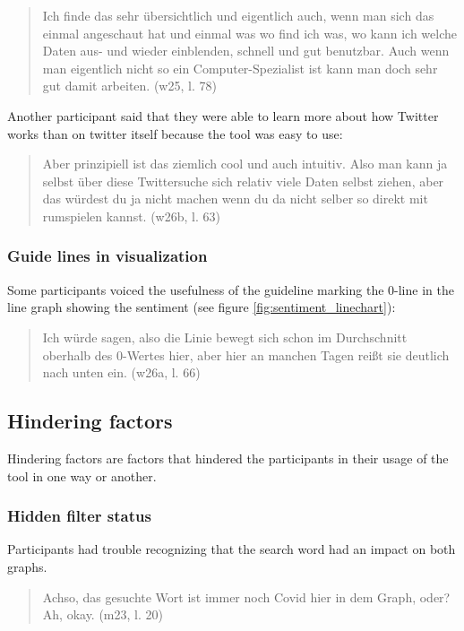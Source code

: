 \begin{quote}
    Ich finde das sehr übersichtlich und eigentlich auch, wenn man sich das einmal angeschaut hat und einmal was wo find ich was, wo kann ich welche Daten aus- und wieder einblenden, schnell und gut benutzbar. Auch wenn man eigentlich nicht so ein Computer-Spezialist ist kann man doch sehr gut damit arbeiten. (w25, l. 78)
\end{quote}

Another participant said that they were able to learn more about how Twitter works than on twitter itself because the tool was easy to use:

\begin{quote}
    Aber prinzipiell ist das ziemlich cool und auch intuitiv. Also man kann ja selbst über diese Twittersuche sich relativ viele Daten selbst ziehen, aber das würdest du ja nicht machen wenn du da nicht selber so direkt mit rumspielen kannst. (w26b, l. 63)
\end{quote}

\subsubsection*{Guide lines in visualization}
Some participants voiced the usefulness of the guideline marking the 0-line in the line graph showing the sentiment (see figure \ref{fig:sentiment_linechart}):

\begin{quote}
    Ich würde sagen, also die Linie bewegt sich schon im Durchschnitt oberhalb des 0-Wertes hier, aber hier an manchen Tagen reißt sie deutlich nach unten ein. (w26a, l. 66)
\end{quote}

\clearpage
\subsection{Hindering factors}
Hindering factors are factors that hindered the participants in their usage of the tool in one way or another.

\subsubsection*{Hidden filter status}
Participants had trouble recognizing that the search word had an impact on both graphs.

\begin{quote}
    Achso, das gesuchte Wort ist immer noch Covid hier in dem Graph, oder? Ah, okay. (m23, l. 20)
\end{quote}

